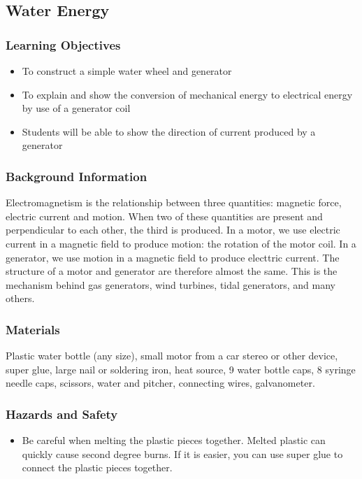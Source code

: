 \subsection{Water Energy}

\subsubsection*{Learning Objectives}
\begin{itemize}
\item{To construct a simple water wheel and generator} 
\item{To explain and show the conversion of mechanical energy to electrical energy by use of a generator coil}
\item{Students will be able to show the direction of current produced by a generator}
\end{itemize}

\subsubsection*{Background Information}
Electromagnetism is the relationship between three quantities: magnetic force, electric current and motion.  When two of these quantities are present and perpendicular to each other, the third is produced.  In a motor, we use electric current in a magnetic field to produce motion: the rotation of the motor coil.  In a generator, we use motion in a magnetic field to produce electtric current.  The structure of a motor and generator are therefore almost the same.  This is the mechanism behind gas generators, wind turbines, tidal generators, and many others.

\subsubsection*{Materials}
Plastic water bottle (any size), small motor from a car stereo or other device, super glue, large nail or soldering iron, heat source, 9 water bottle caps, 8 syringe needle caps, scissors, water and pitcher, connecting wires, galvanometer.  

\subsubsection*{Hazards and Safety}
\begin{itemize}
\item{Be careful when melting the plastic pieces together.  Melted plastic can quickly cause second degree burns.  If it is easier, you can use super glue to connect the plastic pieces together.}
\end{itemize}

